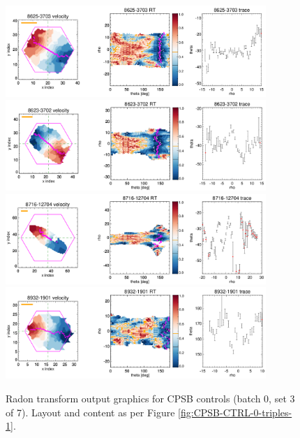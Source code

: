 \documentclass[fleqn,usenatbib]{mnras}
\begin{document}
\begin{figure}
    \centering
    \includegraphics[width=0.88\textwidth]{Images/SN1-MC250/CPSB-CTRL-triples/CPSB-CTRL-8625-3703-1-250.png}
    \includegraphics[width=0.88\textwidth]{Images/SN1-MC250/CPSB-CTRL-triples/CPSB-CTRL-8626-3702-1-250.png}
    \includegraphics[width=0.88\textwidth]{Images/SN1-MC250/CPSB-CTRL-triples/CPSB-CTRL-8716-12704-1-250.png}
    \includegraphics[width=0.88\textwidth]{Images/SN1-MC250/CPSB-CTRL-triples/CPSB-CTRL-8932-1901-1-250.png}    
    \caption{Radon transform output graphics for CPSB controls (batch 0, set 3 of 7). Layout and content as per Figure \ref{fig:CPSB-CTRL-0-triples-1}.}
    \label{fig:CPSB-CTRL-0-triples-3}
\end{figure}
\end{document}
